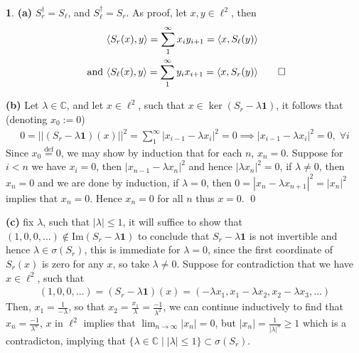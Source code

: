 \documentclass[11pt]{article}
\theoremstyle{definition}
\newtheorem{pb}{}
\newcommand{\set}[1]{\{#1\}}
\newcommand{\abs}[1]{\left\vert#1\right\vert}
\newcommand{\norm}[1]{\lvert\lvert#1\rvert\rvert}
\newcommand{\tand}{\text{ and }}
\newcommand{\im}{\text{Im}}
\newcommand{\gen}[1]{\langle #1 \rangle}
\begin{document}
    \begin{pb}
        \textbf{(a)} \(S_r^\dagger = S_\ell\), and \(S_\ell^\dagger = S_r\). As proof, let \(x,y \in \ell^2\), then
        \begin{align*}
            &\gen{S_r(x),y} = \sum_1^\infty x_iy_{i+1} = \gen{x,S_\ell(y)} \\
            \tand &\gen{S_\ell(x),y} = \sum_1^\infty y_ix_{i+1} = \gen{x,S_r(y)} \qed
        \end{align*}
        
        \textbf{(b)} Let \(\lambda \in \mathbb{C}\), and let \(x \in \ell^2\), such that \(x \in \ker(S_r - \lambda\mathbf{1})\), it follows that (denoting \(x_0 := 0\))
        \begin{align*}
            0 = \norm{(S_r - \lambda\mathbf{1})(x)}^2 = \sum_1^\infty \abs{x_{i-1} - \lambda x_i}^2 = 0 \implies \abs{x_{i-1} - \lambda x_i}^2 = 0, \; \forall i
        \end{align*}
        Since \(x_0 \overset{\text{def}}{=} 0\), we may show by induction that for each \(n\), \(x_n = 0\). Suppose for \(i < n\) we have \(x_i = 0\), then \(\abs{x_{n-1} - \lambda x_n}^2\) and hence \(\abs{\lambda x_n}^2 = 0\), if \(\lambda \neq 0\), then \(x_n = 0\) and we are done by induction, if \(\lambda = 0\), then \(0 = \abs{x_n - \lambda x_{n+1}}^2 = \abs{x_n}^2\) implies that \(x_n = 0\). Hence \(x_n = 0\) for all \(n\) thus \(x = 0\). \qed

        \textbf{(c)} fix \(\lambda\), such that \(\abs{\lambda} \leq 1\), it will suffice to show that \((1,0,0,\hdots) \not \in \im(S_r - \lambda\mathbf{1})\) to conclude that \(S_r - \lambda\mathbf{1}\) is not invertible and hence \(\lambda \in \sigma(S_r)\), this is immediate for \(\lambda = 0\), since the first coordinate of \(S_r(x)\) is zero for any \(x\), so take \(\lambda \neq 0\). Suppose for contradiction that we have \(x \in \ell^2\), such that
        \begin{align*}
            (1,0,0,\hdots) = (S_r - \lambda\mathbf{1})(x) = (-\lambda x_1,x_1 - \lambda x_2, x_2 - \lambda x_3, \hdots)
        \end{align*}
        Then, \(x_1 = \frac{1}{-\lambda}\), so that \(x_2 = \frac{x_1}{\lambda} = \frac{-1}{\lambda^2}\), we can continue inductively to find that \(x_n = \frac{-1}{\lambda^n}\), \(x\) in \(\ell^2\) implies that \(\lim_{n \to \infty}\abs{x_n} = 0\), but \(\abs{x_n} = \frac{1}{\abs{\lambda}^n} \geq 1\) which is a contradicton, implying that \(\set{\lambda \in \mathbb{C} \mid \abs{\lambda} \leq 1} \subset \sigma(S_r)\).


\end{pb}
\end{document}
